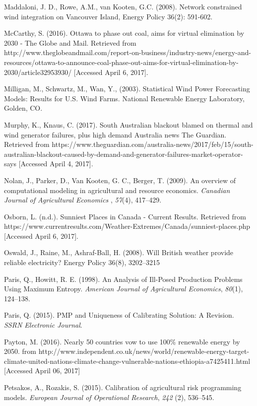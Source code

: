 \documentclass[10pt,letter]{article}
\begin{document}
Maddaloni, J. D., Rowe, A.M., van Kooten, G.C. (2008). Network
constrained wind integration on Vancouver Island, Energy Policy 36(2):
591-602.

McCarthy, S. (2016). Ottawa to phase out coal, aims for virtual
elimination by 2030 - The Globe and Mail. Retrieved from
http://www.theglobeandmail.com/report-on-business/industry-news/energy-and-resources/ottawa-to-announce-coal-phase-out-aims-for-virtual-elimination-by-2030/article32953930/
{[}Accessed April 6, 2017{]}.

Milligan, M., Schwartz, M., Wan, Y., (2003). Statistical Wind Power
Forecasting Models: Results for U.S. Wind Farms. National Renewable
Energy Laboratory, Golden, CO.

Murphy, K., Knaus, C. (2017). South Australian blackout blamed on
thermal and wind generator failures, plus high demand \textbar{}
Australia news \textbar{} The Guardian. Retrieved from
https://www.theguardian.com/australia-news/2017/feb/15/south-australian-blackout-caused-by-demand-and-generator-failures-market-operator-says
{[}Accessed April 4, 2017{]}.

Nolan, J., Parker, D., Van Kooten, G. C., Berger, T. (2009). An overview
of computational modeling in agricultural and resource economics.
\emph{Canadian Journal of Agricultural Economics} , \emph{57}(4),
417--429.

Osborn, L. (n.d.). Sunniest Places in Canada - Current Results.
Retrieved from
https://www.currentresults.com/Weather-Extremes/Canada/sunniest-places.php
{[}Accessed April 6, 2017{]}.

Oswald, J., Raine, M., Ashraf-Ball, H. (2008). Will British weather
provide reliable electricity? Energy Policy 36(8), 3202--3215

Paris, Q., Howitt, R. E. (1998). An Analysis of Ill-Posed Production
Problems Using Maximum Entropy. \emph{American Journal of Agricultural
Economics}, \emph{80}(1), 124--138.

Paris, Q. (2015). PMP and Uniqueness of Calibrating Solution: A
Revision. \emph{SSRN Electronic Journal}.

Payton, M. (2016). Nearly 50 countries vow to use 100\% renewable energy
by 2050. from
http://www.independent.co.uk/news/world/renewable-energy-target-climate-united-nations-climate-change-vulnerable-nations-ethiopia-a7425411.html
{[}Accessed April 06, 2017{]}

Petsakos, A., Rozakis, S. (2015). Calibration of agricultural risk
programming models. \emph{European Journal of Operational Research},
\emph{242} (2), 536--545.
\end{document}

